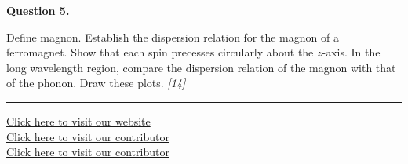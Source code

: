 \documentclass[11pt,a4paper]{article}
\newcommand{\pts}[1]{\hfill   \textit{[#1]}}
\begin{document}
\noindent   \textbf{Question 5.}

\begin{parts}
  \item Define magnon. Establish the dispersion relation for the magnon of a ferromagnet. Show that each spin precesses circularly about the $z$-axis. In the long wavelength region, compare the dispersion relation of the magnon with that of the phonon. Draw these plots. \pts{14}
\end{parts}

\vfill
\rule{\linewidth}{0.4pt}

\begin{center}\small
  \href{https://bhu-exam.vercel.app/}{Click here to visit our website}\\[4pt]
  \href{https://me-aryan.vercel.app/}{Click here to visit our contributor}\\[4pt]
  \href{https://quashan-me.vercel.app/}{Click here to visit our contributor}
\end{center}
\end{document}

